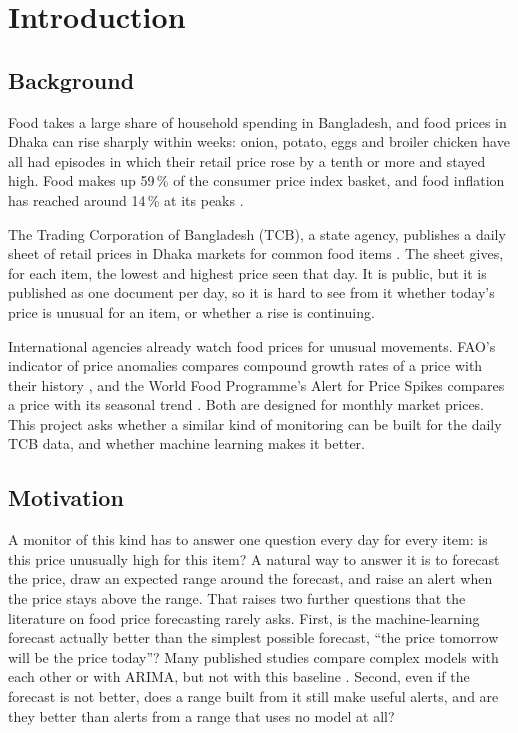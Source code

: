 \chapter{Introduction}\label{ch:intro}

\section{Background}
Food takes a large share of household spending in Bangladesh, and food prices in Dhaka can rise sharply within weeks: onion, potato, eggs and broiler chicken have all had episodes in which their retail price rose by a tenth or more and stayed high. Food makes up 59\,\% of the consumer price index basket, and food inflation has reached around 14\,\% at its peaks \cite{cpd2026}.

The Trading Corporation of Bangladesh (TCB), a state agency, publishes a daily sheet of retail prices in Dhaka markets for common food items \cite{tcb}. The sheet gives, for each item, the lowest and highest price seen that day. It is public, but it is published as one document per day, so it is hard to see from it whether today's price is unusual for an item, or whether a rise is continuing.

International agencies already watch food prices for unusual movements. FAO's indicator of price anomalies compares compound growth rates of a price with their history \cite{baquedano2015}, and the World Food Programme's Alert for Price Spikes compares a price with its seasonal trend \cite{wfpalps2014}. Both are designed for monthly market prices. This project asks whether a similar kind of monitoring can be built for the daily TCB data, and whether machine learning makes it better.

\section{Motivation}
A monitor of this kind has to answer one question every day for every item: is this price unusually high for this item? A natural way to answer it is to forecast the price, draw an expected range around the forecast, and raise an alert when the price stays above the range. That raises two further questions that the literature on food price forecasting rarely asks. First, is the machine-learning forecast actually better than the simplest possible forecast, ``the price tomorrow will be the price today''? Many published studies compare complex models with each other or with ARIMA, but not with this baseline \cite{manogna2025}. Second, even if the forecast is not better, does a range built from it still make useful alerts, and are they better than alerts from a range that uses no model at all?

